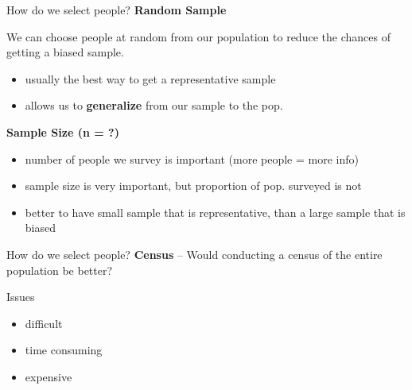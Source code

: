 \documentclass{beamer}
\begin{document}
\begin{frame}{How do we select people?}
\textbf{Random Sample}

We can choose people at random from our population to reduce the chances of getting a biased sample.
\begin{itemize}
    \item usually the best way to get a representative sample
    \item allows us to \textbf{generalize} from our sample to the pop.
\end{itemize} \vspace{8mm}

\textbf{Sample Size (n = ?)}
\begin{itemize}
    \item number of people we survey is important (more people = more info)
    \item sample size is very important, but proportion of pop. surveyed is not
    \item better to have small sample that is representative, than a large sample that is biased
\end{itemize}
\end{frame}



\begin{frame}{How do we select people?}
\textbf{Census} -- Would conducting a census of the entire population be better? \vspace{4mm}

Issues
\begin{itemize}
    \item difficult
    \item time consuming
    \item expensive
\end{itemize}
\end{frame}
\end{document}
